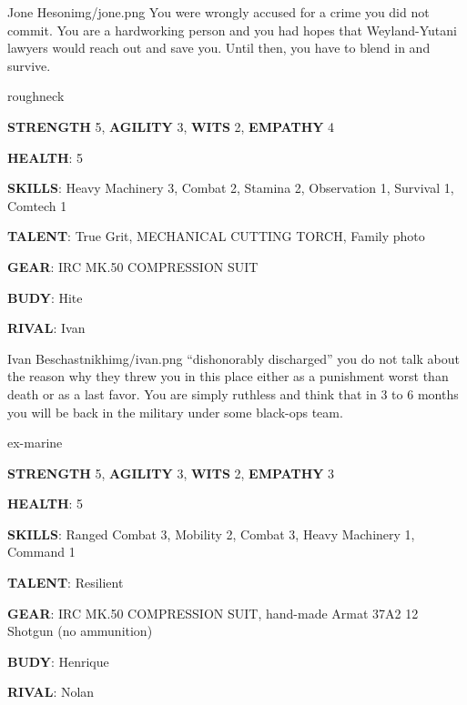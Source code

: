 \begin{rpg-pcbox}{Jone Heson}{img/jone.png}
    You were wrongly accused for a crime you did not commit. You are a hardworking person and you had hopes that Weyland-Yutani lawyers would reach out and save you. Until then, you have to blend in and survive.
\end{rpg-pcbox}

\begin{rpg-commentbox}{}
    roughneck

    \textbf{STRENGTH} 5, \textbf{AGILITY} 3, \textbf{WITS} 2, \textbf{EMPATHY} 4

    \textbf{HEALTH}: 5

    \textbf{SKILLS}: Heavy Machinery 3, Combat 2, Stamina 2, Observation 1, Survival 1, Comtech 1
    
    \textbf{TALENT}: True Grit, MECHANICAL CUTTING TORCH, Family photo
    
    \textbf{GEAR}: IRC MK.50 COMPRESSION SUIT

    \textbf{BUDY}: Hite
    
    \textbf{RIVAL}: Ivan
\end{rpg-commentbox}

\newsect


\begin{rpg-pcbox}{Ivan Beschastnikh}{img/ivan.png}
    ``dishonorably discharged'' you do not talk about the reason why they threw you in this place either as a punishment worst than death or as a last favor. You are simply ruthless and think that in 3 to 6 months you will be back in the military under some black-ops team.
\end{rpg-pcbox}

\begin{rpg-commentbox}{}
    ex-marine

    \textbf{STRENGTH} 5, \textbf{AGILITY} 3, \textbf{WITS} 2, \textbf{EMPATHY} 3

    \textbf{HEALTH}: 5

    \textbf{SKILLS}: Ranged Combat 3, Mobility 2, Combat 3, Heavy Machinery 1, Command 1
    
    \textbf{TALENT}: Resilient
    
    \textbf{GEAR}: IRC MK.50 COMPRESSION SUIT, hand-made Armat 37A2 12 Shotgun (no ammunition)

    \textbf{BUDY}: Henrique
    
    \textbf{RIVAL}: Nolan
\end{rpg-commentbox}

